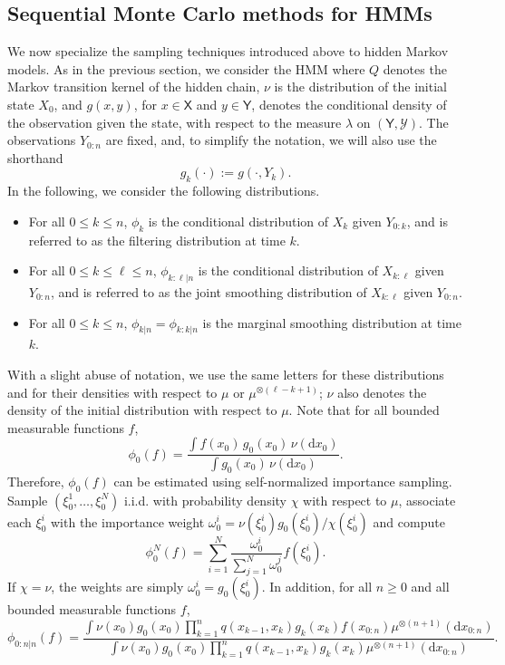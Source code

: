\documentclass[english,graybox,envcountchap,envcountsame,sectrefs,shortlabels]{svmono}
\theoremstyle{style}
\newcommand{\eqsp}{}
\begin{document}
\subsection{Sequential Monte Carlo methods for HMMs}
\label{sec:smc:hmm}
We now specialize the sampling techniques introduced above to hidden Markov
models. As in the previous section, we consider the HMM where $Q$ denotes the Markov transition kernel of the hidden
chain, $\nu$ is the distribution of the initial state $X_0$, and $g(x,y)$, for
$x\in \mathsf{X}$ and $y \in \mathsf{Y}$, denotes the conditional density of the
observation given the state, with respect to the measure $\lambda$ on
$(\mathsf{Y},\mathcal{Y})$. The observations $Y_{0:n}$ are fixed, and, to simplify the notation, we will also use the shorthand
\[
g_k(\cdot) := g(\cdot, Y_k)\eqsp.
\]
In the following, we consider the following distributions.
\begin{itemize}
\item For all $0\leq k \leq n$, $\phi_k$ is the conditional distribution of $X_k$ given $Y_{0:k}$, and is referred to as the filtering distribution at time $k$.
\item For all $0\leq k \leq \ell \leq n$, $\phi_{k:\ell|n}$ is the conditional distribution of $X_{k:\ell}$ given $Y_{0:n}$, and is referred to as the joint smoothing distribution of $X_{k:\ell}$ given $Y_{0:n}$.
\item  For all $0\leq k \leq n$, $\phi_{k|n} = \phi_{k:k|n}$ is the marginal smoothing distribution at time $k$.
\end{itemize}
With a slight abuse of notation, we use the same letters for these distributions and for their densities with respect to $\mu$ or $\mu^{\otimes(\ell-k+1)}$; $\nu$ also denotes the density of the initial distribution with respect to $\mu$.
Note that for all bounded measurable functions $f$,
\[
\phi_0(f) = \frac{\int f(x_0)\, g_0(x_0)\, \nu(\mathrm{d}x_0)}
{\int g_0(x_0)\, \nu(\mathrm{d}x_0)}\eqsp.
\]
Therefore, $\phi_0(f)$ can be estimated using self-normalized importance sampling. Sample $(\xi_0^1,\ldots,\xi_0^N)$ i.i.d. with probability density $\chi$ with respect to $\mu$, associate each $\xi_0^i$ with the importance weight $\omega_0^i = \nu(\xi_0^i)g_0(\xi^i_0)/\chi(\xi_0^i)$ and compute
$$
\phi^N_0(f) = \sum_{i=1}^N\frac{\omega_0^i}{\sum_{j=1}^N\omega_0^j}f(\xi_0^i)\eqsp.
$$
If $\chi = \nu$, the weights are simply $\omega_0^i = g_0(\xi_0^i)$.
In addition, for all $n\geq 0$ and all bounded measurable functions $f$,
$$
\phi_{0:n|n}(f) =  \frac{\int \nu(x_0) g_0(x_0)
\prod_{k=1}^{n} q(x_{k-1}, x_k) g_k(x_k)f(x_{0:n})\mu^{\otimes (n+1)}(\mathrm{d}x_{0:n})}{\int \nu(x_0) g_0(x_0)
\prod_{k=1}^{n} q(x_{k-1}, x_k) g_k(x_k)\mu^{\otimes (n+1)}(\mathrm{d}x_{0:n})}\eqsp.
$$
\end{document}
